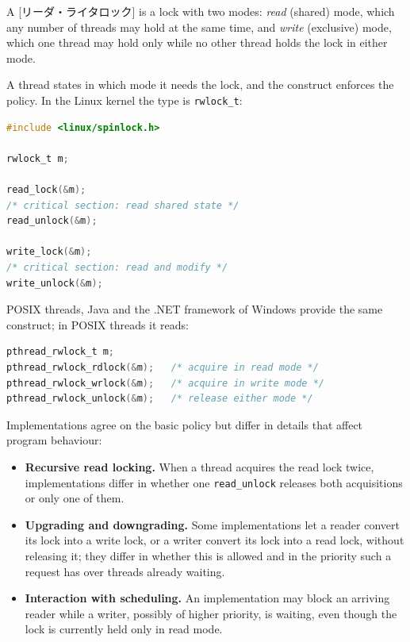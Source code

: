 \documentclass[../main.tex]{subfiles}
\begin{document}
\begin{definition}
  A [リーダ・ライタロック] is a lock with two
  modes: \emph{read} (shared) mode, which any number of threads may hold at
  the same time, and \emph{write} (exclusive) mode, which one thread may
  hold only while no other thread holds the lock in either mode.
\end{definition}

A thread states in which mode it needs the lock, and the construct
enforces the policy.  In the Linux kernel the type is
\texttt{rwlock\_t}:
\begin{lstlisting}[language=C, numbers=none]
#include <linux/spinlock.h>

rwlock_t m;

read_lock(&m);
/* critical section: read shared state */
read_unlock(&m);

write_lock(&m);
/* critical section: read and modify */
write_unlock(&m);
\end{lstlisting}
POSIX threads, Java and the .NET framework of Windows provide the same
construct; in POSIX threads it reads:
\begin{lstlisting}[language=C, numbers=none]
pthread_rwlock_t m;
pthread_rwlock_rdlock(&m);   /* acquire in read mode */
pthread_rwlock_wrlock(&m);   /* acquire in write mode */
pthread_rwlock_unlock(&m);   /* release either mode */
\end{lstlisting}

Implementations agree on the basic policy but differ in details that affect
program behaviour:
\begin{itemize}
  \item \textbf{Recursive read locking.}  When a thread acquires the read
    lock twice, implementations differ in whether one
    \texttt{read\_unlock} releases both acquisitions or only one of them.
  \item \textbf{Upgrading and downgrading.}  Some implementations let a
    reader convert its lock into a write lock, or a writer convert its lock
    into a read lock, without releasing it; they differ in whether this is
    allowed and in the priority such a request has over threads already
    waiting.
  \item \textbf{Interaction with scheduling.}  An implementation may block
    an arriving reader while a writer, possibly of higher priority, is
    waiting, even though the lock is currently held only in read mode.
\end{itemize}
\end{document}
